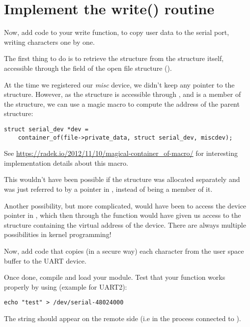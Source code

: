 \section{Implement the write() routine}

Now, add code to your write function, to copy user data to the serial
port, writing characters one by one.

The first thing to do is to retrieve the  structure
from the  structure itself, accessible through the
 field of the open file structure ().

At the time we registered our {\em misc} device, we didn't keep any
pointer to the  structure. However, as the
 structure is accessible through
, and is a member of the
 structure, we can use a magic macro to compute
the address of the parent structure:

\begin{verbatim}
struct serial_dev *dev =
	container_of(file->private_data, struct serial_dev, miscdev);
\end{verbatim}

See \url{https://radek.io/2012/11/10/magical-container_of-macro/}
for interesting implementation details about this macro.

This wouldn't have been possible if the  structure
was allocated separately and was just referred to by a pointer in
, instead of being a member of it.

Another possibility, but more complicated, would have been to access the
 device pointer in , which then through
the  function would
have given us access to the  structure containing the
virtual address of the device. There are always multiple possibilities
in kernel programming!

Now, add code that copies (in a secure way) each character from the
user space buffer to the UART device.

Once done, compile and load your module. Test that your  function
works properly by using (example for UART2):

\begin{verbatim}
echo "test" > /dev/serial-48024000
\end{verbatim}

The  string should appear on the remote side (i.e in
the  process connected to ).

